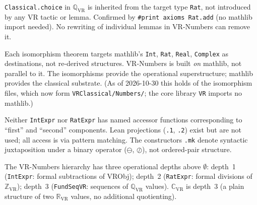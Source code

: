 \begin{remark}
\label{rem:classical_structural}
\leanok
{}
\texttt{Classical.choice} in $\mathbb{Q}_{\mathrm{VR}}$ is inherited from the
target type \texttt{Rat}, not introduced by any VR tactic or lemma.  Confirmed
by \texttt{\#print axioms Rat.add} (no mathlib import needed).  No rewriting of
individual lemmas in VR-Numbers can remove it.
\end{remark}

\begin{remark}
\label{rem:mathlib_black_box}
\leanok
Each isomorphism theorem targets mathlib's \texttt{Int}, \texttt{Rat},
\texttt{Real}, \texttt{Complex} as destinations, not re-derived structures.
VR-Numbers is built \emph{on} mathlib, not parallel to it.  The isomorphisms
provide the operational superstructure; mathlib provides the classical substrate.
(As of 2026-10-30 this holds of the isomorphism files, which now form
\texttt{VRClassical/Numbers/}; the core library \texttt{VR} imports no mathlib.)
\end{remark}

\begin{remark}
\label{rem:no_pairs}
\leanok
{}
Neither \texttt{IntExpr} nor \texttt{RatExpr} has named accessor functions
corresponding to ``first'' and ``second'' components.  Lean projections
(\texttt{.1}, \texttt{.2}) exist but are not used; all access is via pattern
matching.  The constructors \texttt{.mk} denote syntactic juxtaposition under
a binary operator ($\ominus$, $\oslash$), not ordered-pair structure.
\end{remark}

\begin{remark}
\label{rem:depth}
\leanok
{}
The VR-Numbers hierarchy has three operational depths above $\emptyset$:
depth~1 (\texttt{IntExpr}: formal subtractions of VRObj);
depth~2 (\texttt{RatExpr}: formal divisions of $\mathbb{Z}_{\mathrm{VR}}$);
depth~3 (\texttt{FundSeqVR}: sequences of $\mathbb{Q}_{\mathrm{VR}}$ values).
$\mathbb{C}_{\mathrm{VR}}$ is depth~3 (a plain structure of two $\mathbb{R}_{\mathrm{VR}}$
values, no additional quotienting).
\end{remark}

